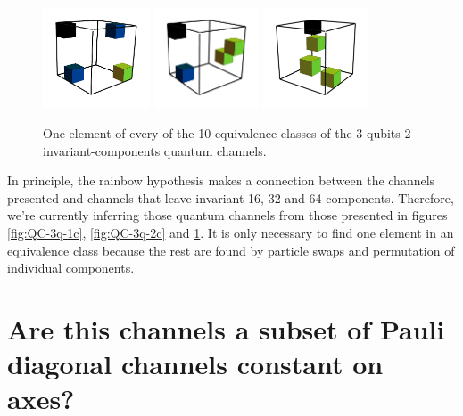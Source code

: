 \documentclass[11pt,dvipsnames]{article} %
\newcommand{\1}{\mathds{1}}
\begin{document}
\begin{figure}[H]
	\hfill
	\includegraphics[height=3cm]{img/3q-4c-no-3}
	\hfill
	\includegraphics[height=3cm]{img/3q-4c-no-4}
	\hfill
	\includegraphics[height=3cm]{img/3q-4c-no-5}
	\hfill \hfill
	\caption{One element of every of the 10 equivalence
	classes of the 3-qubits 2-invariant-components quantum channels.}
	\label{fig:QC-3q-4c}
\end{figure}

In principle, the rainbow hypothesis makes a connection between the 
channels presented and channels that leave invariant 16, 32 and 64
components. Therefore, we're currently inferring those quantum channels
from those presented in figures \ref{fig:QC-3q-1c}, \ref{fig:QC-3q-2c} and
\ref{fig:QC-3q-4c}. It is only necessary to find one element in an 
equivalence class because the rest are found by particle swaps 
and permutation of individual components.

\section*{Are this channels a subset of Pauli diagonal channels constant on axes?} %
\end{document}
